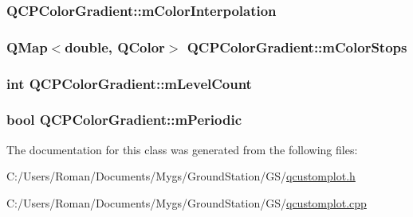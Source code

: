 \subsubsection[{m\+Color\+Interpolation}]{ Q\+C\+P\+Color\+Gradient\+::m\+Color\+Interpolation\hspace{0.3cm}{\ttfamily [protected]}}\label{class_q_c_p_color_gradient_a028cef73d863800a9ee93ffd641cce01}
\hypertarget{class_q_c_p_color_gradient_a9e11a2b0974ef289d12c324822bc3a3e}{}
\subsubsection[{m\+Color\+Stops}]{\setlength{\rightskip}{0pt plus 5cm}Q\+Map$<$double, Q\+Color$>$ Q\+C\+P\+Color\+Gradient\+::m\+Color\+Stops\hspace{0.3cm}{\ttfamily [protected]}}\label{class_q_c_p_color_gradient_a9e11a2b0974ef289d12c324822bc3a3e}
\hypertarget{class_q_c_p_color_gradient_a98fb68e359904b2c991fcae3e38a211a}{}
\subsubsection[{m\+Level\+Count}]{\setlength{\rightskip}{0pt plus 5cm}int Q\+C\+P\+Color\+Gradient\+::m\+Level\+Count\hspace{0.3cm}{\ttfamily [protected]}}\label{class_q_c_p_color_gradient_a98fb68e359904b2c991fcae3e38a211a}
\hypertarget{class_q_c_p_color_gradient_a4b07deeb20ca1ee2d5ea7e01bf0420af}{}
\subsubsection[{m\+Periodic}]{\setlength{\rightskip}{0pt plus 5cm}bool Q\+C\+P\+Color\+Gradient\+::m\+Periodic\hspace{0.3cm}{\ttfamily [protected]}}\label{class_q_c_p_color_gradient_a4b07deeb20ca1ee2d5ea7e01bf0420af}


The documentation for this class was generated from the following files\+:\begin{DoxyCompactItemize}
\item 
C\+:/\+Users/\+Roman/\+Documents/\+Mygs/\+Ground\+Station/\+G\+S/\hyperlink{qcustomplot_8h}{qcustomplot.\+h}\item 
C\+:/\+Users/\+Roman/\+Documents/\+Mygs/\+Ground\+Station/\+G\+S/\hyperlink{qcustomplot_8cpp}{qcustomplot.\+cpp}\end{DoxyCompactItemize}
